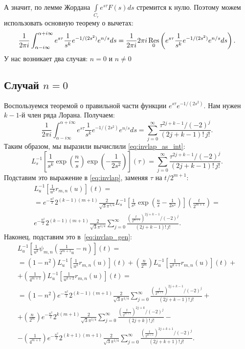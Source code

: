 \documentclass[12pt, a4paper]{report}
\begin{document}
А значит, по лемме Жордана $\int\limits_{C_r} e^{s\tau} F(s)ds$ стремится к нулю.
Поэтому можем использовать основную теорему о вычетах:
\[
    \frac{1}{2\pi i}\int_{\alpha-i\infty}^{\alpha+i\infty} e^{s\tau} \frac{1}{s^k} e^{-1/(2s^2)} e^{n/s} ds =
    \frac{1}{2\pi i} 2\pi i \operatorname*{Res}_0 \left( e^{s\tau} \frac{1}{s^k} e^{-1/(2s^2)} e^{n/s} ds \right)
.\]
У нас возникает два случая: $n=0$ и $n\neq$0
\subsection{Случай $n = 0$}
Воспользуемся теоремой о правильной части функции $e^{s\tau} e^{-1/(2s^2)}$. Нам нужен $k-1$-й член ряда Лорана. Получаем:
\[
    \frac{1}{2\pi i}\int_{\alpha-i\infty}^{\alpha+i\infty} e^{s\tau} \frac{1}{s^k} e^{-1/(2s^2)} e^{n/s} ds =
    \sum_{j=0}^{\infty} \frac{\tau^{2j+k-1} / (-2)^j}{(2j+k-1)!\,j!}
.\]
Таким образом, мы выразили вычислили \ref{eq:invlap_as_int}:
\[
    L^{-1}_s \left[ \frac{1}{s^k}
    \exp \left(\frac{n}{s}\right)
    \exp \left(-\frac{1}{2 s^2 }\right)
    \right] \left( \tau \right)
=
    \sum_{j=0}^{\infty} \frac{\tau^{2j+k-1} / (-2)^j}{(2j+k-1)!\,j!}
.\]
Подставим это выражение в \ref{eq:invlap}, заменяя $\tau$ на $t/2^{m+1}$:
\begin{multline*}
    L^{-1}_u \left[ \frac{1}{u^k} r_{m,n}(u) \right](t)
=\\=%
    e^{-\frac{n^2}{2}} 2^{(k-1)(m+1)} \frac{2}{\sqrt{3} \pi^{1/4}}
    L^{-1}_s \left[ \frac{1}{s^k}
    \exp \left(\frac{n}{s} - \frac{1}{2 s^2 }
    \right)
    \right] \left( \frac{t}{2^{m+1}} \right) =
\\%
    e^{-\frac{n^2}{2}} 2^{(k-1)(m+1)} \frac{2}{\sqrt{3} \pi^{1/4}}
    \sum_{j=0}^{\infty} \frac{\left(\frac{t}{2^{m+1}}\right)^{2j+k-1} / (-2)^j}{(2j+k-1)!\,j!}
.\end{multline*}
Наконец, подставим это в~\ref{eq:invlap_gen}:
\begin{multline}
    L^{-1}_u \left[ \frac{1}{u^k} \psi_{m,n} \left( \frac{1}{2^{m+1} u} - n \right) \right] (t)
=\\=
    \left( 1 - n^2 \right)  L^{-1}_u \left[ \frac{1}{u^k} r_{m,n}(u) \right](t) +
    \left( \frac{n}{2^m} \right)  L^{-1}_u \left[ \frac{1}{u^{k+1}} r_{m,n}(u) \right](t)
+\\+
    \left( \frac{1}{4^{m+1}} \right)  L^{-1}_u \left[ \frac{1}{u^{k+2}} r_{m,n}(u) \right](t)
=\\=
    \left( 1-n^2 \right) 
    e^{-\frac{n^2}{2}} 2^{(k-1)(m+1)} \frac{2}{\sqrt{3} \pi^{1/4}}
    \sum_{j=0}^{\infty} \frac{\left(\frac{t}{2^{m+1}}\right)^{2j+k-1} / (-2)^j}{(2j+k-1)!\,j!}
+\\+
    \left( \frac{n}{2^m} \right) 
    e^{-\frac{n^2}{2}} 2^{k(m+1)} \frac{2}{\sqrt{3} \pi^{1/4}}
    \sum_{j=0}^{\infty} \frac{\left(\frac{t}{2^{m+1}}\right)^{2j+k} / (-2)^j}{(2j+k)!\,j!}
-\\-
    \left( \frac{1}{4^{m+1}} \right) 
    e^{-\frac{n^2}{2}} 2^{(k+1)(m+1)} \frac{2}{\sqrt{3} \pi^{1/4}}
    \sum_{j=0}^{\infty} \frac{\left(\frac{t}{2^{m+1}}\right)^{2j+k+1} / (-2)^j}{(2j+k+1)!\,j!}
.\end{multline}
\end{document}
